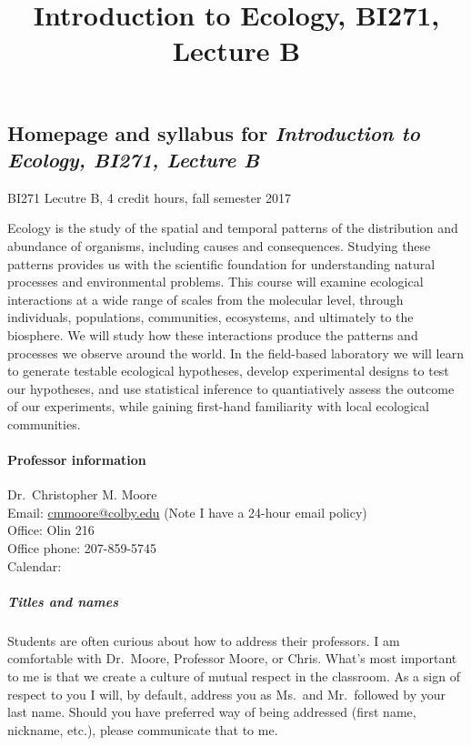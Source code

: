 \documentclass[]{article}
\title{Introduction to Ecology, BI271, Lecture B}
\date{}
\let\oldparagraph\paragraph
\renewcommand{\paragraph}[1]{\oldparagraph{#1}\mbox{}}
\let\oldsubparagraph\subparagraph
\renewcommand{\subparagraph}[1]{\oldsubparagraph{#1}\mbox{}}
\begin{document}
\maketitle

\subsection{\texorpdfstring{Homepage and syllabus for \emph{Introduction
to Ecology, BI271, Lecture B}
}{Homepage and syllabus for Introduction to Ecology, BI271, Lecture B }}\label{homepage-and-syllabus-for-introduction-to-ecology-bi271-lecture-b}

BI271 Lecutre B, 4 credit hours, fall semester 2017

Ecology is the study of the spatial and temporal patterns of the
distribution and abundance of organisms, including causes and
consequences. Studying these patterns provides us with the scientific
foundation for understanding natural processes and environmental
problems. This course will examine ecological interactions at a wide
range of scales from the molecular level, through individuals,
populations, communities, ecosystems, and ultimately to the biosphere.
We will study how these interactions produce the patterns and processes
we observe around the world. In the field-based laboratory we will learn
to generate testable ecological hypotheses, develop experimental designs
to test our hypotheses, and use statistical inference to quantiatively
assess the outcome of our experiments, while gaining first-hand
familiarity with local ecological communities.

\paragraph{Professor information }\label{professor-information}

Dr.~Christopher M. Moore\\
Email: \url{cmmoore@colby.edu} (Note I have a 24-hour email policy)\\
Office: Olin 216\\
Office phone: 207-859-5745\\
Calendar: ~

\subparagraph{Titles and names}\label{titles-and-names}

Students are often curious about how to address their professors. I am
comfortable with Dr.~Moore, Professor Moore, or Chris. What's most
important to me is that we create a culture of mutual respect in the
classroom. As a sign of respect to you I will, by default, address you
as Ms.~and Mr.~followed by your last name. Should you have preferred way
of being addressed (first name, nickname, etc.), please communicate that
to me.
\end{document}
